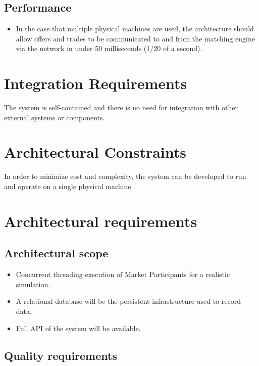 \documentclass[12pt]{article}
\begin{document}
			\subsection{Performance}
			\begin{itemize}
			\item In the case that multiple physical machines are used, the architecture should allow offers and trades to be communicated to and from the matching engine via the network in under 50 milliseconds (1/20 of a second). 
			\end{itemize}
		\section{Integration Requirements}
		The system is self-contained and there is no need for integration with other external systems or components.
		\section{Architectural Constraints}
		In order to minimize cost and complexity, the system can be developed to run and operate on a single physical machine. 
	
        \newpage
                \section{Architectural requirements}	    
			    \subsection{Architectural scope}	

                                \begin{itemize}
                                     \item Concurrent threading execution of Market Participants for a realistic simulation.
                                     \item A relational database will be the persistent infrastructure used to record data.
                                     \item Full API of the system will be available.
                                 \end{itemize}

			    \subsection{Quality requirements}	
\end{document}
